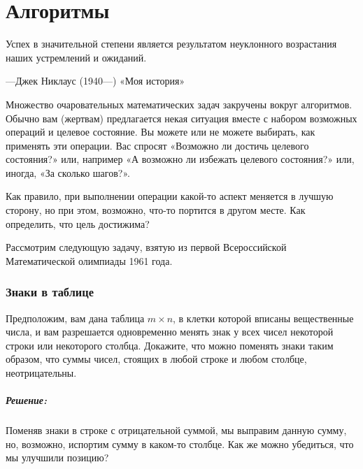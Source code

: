 \chapter*{Алгоритмы}


\setlength{\epigraphwidth}{.8\textwidth}
\epigraph{Успех в значительной степени является результатом неуклонного возрастания наших устремлений и ожиданий.}{---Джек Никлаус (1940---) «Моя история»}



Множество очаровательных математических задач закручены вокруг алгоритмов.
Обычно вам (жертвам) предлагается некая ситуация вместе с набором возможных операций и целевое состояние.
Вы можете или не можете выбирать, как применять эти операции.
Вас спросят «Возможно ли достичь целевого состояния?» или, например «А возможно ли избежать целевого состояния?» или, иногда, «За сколько шагов?».

Как правило, при выполнении операции какой-то аспект меняется в лучшую сторону, но при этом, возможно, что-то портится в другом месте.
Как определить, что цель достижима?

Рассмотрим следующую задачу, взятую из первой Всероссийской Математической олимпиады 1961 года.

\subsection*{Знаки в таблице}%

Предположим, вам дана таблица $m\times n$, в клетки которой вписаны вещественные числа, и вам разрешается одновременно менять знак у всех чисел некоторой строки или некоторого столбца.
Докажите, что можно поменять знаки таким образом, что суммы чисел, стоящих в любой строке и любом столбце, неотрицательны.

\paragraph{Решение:}
Поменяв знаки в строке с отрицательной суммой, мы выправим данную сумму, но, возможно, испортим сумму в каком-то столбце.
Как же можно убедиться, что мы улучшили позицию?

